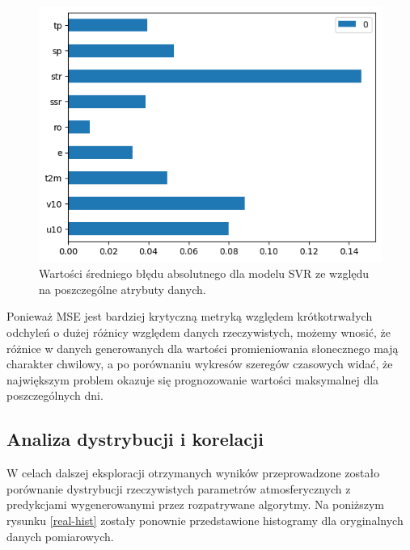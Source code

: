 \begin{figure}[H]
    \centering
    \includegraphics[width=\textwidth]{images/svr_mae_bar.png}
    \caption{Wartości średniego błędu absolutnego dla modelu SVR ze względu na poszczególne atrybuty danych.}
    \label{svr-mae-bar}
\end{figure}

Ponieważ MSE jest bardziej krytyczną metryką względem krótkotrwałych odchyleń o dużej różnicy względem
danych rzeczywistych, możemy wnosić, że różnice w danych generowanych dla wartości promieniowania słonecznego
mają charakter chwilowy, a po porównaniu wykresów szeregów czasowych widać, że największym problem okazuje
się prognozowanie wartości maksymalnej dla poszczególnych dni.

\pagebreak

\subsection{Analiza dystrybucji i korelacji}

W celach dalszej eksploracji otrzymanych wyników przeprowadzone zostało porównanie dystrybucji 
rzeczywistych parametrów atmosferycznych z predykcjami wygenerowanymi przez rozpatrywane algorytmy.
Na poniższym rysunku \ref{real-hist} zostały ponownie przedstawione histogramy dla oryginalnych danych pomiarowych.


